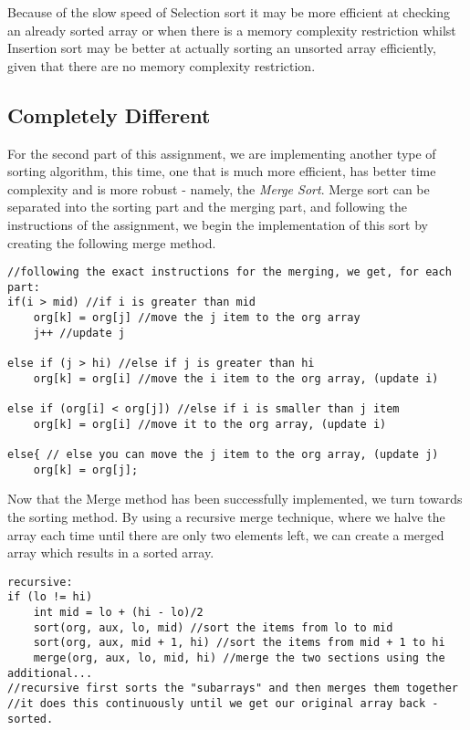 \documentclass[a4paper,11pt]{article}
\begin{document}
Because of the slow speed of Selection sort it may be more efficient at checking an already sorted array or when there is a memory complexity restriction whilst Insertion sort may be better at actually sorting an unsorted array efficiently, given that there are no memory complexity restriction.

\subsection*{Completely Different}

For the second part of this assignment, we are implementing another type of sorting algorithm, this time, one that is much more efficient, has better time complexity and is more robust - namely, the {\em Merge Sort}. Merge sort can be separated into the sorting part and the merging part, and following the instructions of the assignment, we begin the implementation of this sort by creating the following merge method.

\begin{verbatim}
//following the exact instructions for the merging, we get, for each part:
if(i > mid) //if i is greater than mid
    org[k] = org[j] //move the j item to the org array
    j++ //update j
    
else if (j > hi) //else if j is greater than hi
    org[k] = org[i] //move the i item to the org array, (update i)
    
else if (org[i] < org[j]) //else if i is smaller than j item
    org[k] = org[i] //move it to the org array, (update i)
    
else{ // else you can move the j item to the org array, (update j)
    org[k] = org[j];
\end{verbatim}

Now that the Merge method has been successfully implemented, we turn towards the sorting method. By using a recursive merge technique, where we halve the array each time until there are only two elements left, we can create a merged array which results in a sorted array.

\begin{verbatim}
recursive:
if (lo != hi) 
    int mid = lo + (hi - lo)/2
    sort(org, aux, lo, mid) //sort the items from lo to mid
    sort(org, aux, mid + 1, hi) //sort the items from mid + 1 to hi
    merge(org, aux, lo, mid, hi) //merge the two sections using the additional...
//recursive first sorts the "subarrays" and then merges them together
//it does this continuously until we get our original array back - sorted.
\end{verbatim}
\end{document}
